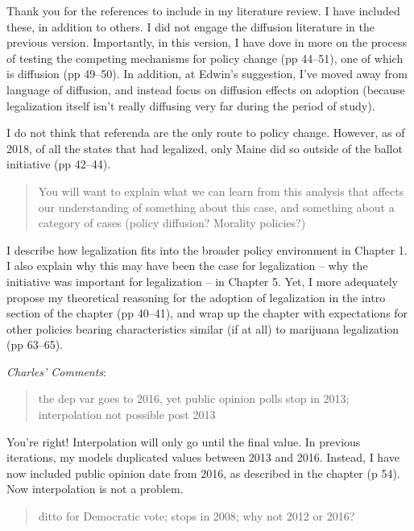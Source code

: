 \documentclass[12pt,stdletter,dateno,sigleft]{newlfm} %
\begin{document}
\begin{newlfm}
Thank you for the references to include in my literature review. I have included these, in addition to others. I did not engage the diffusion literature in the previous version. Importantly, in this version, I have dove in more on the process of testing the competing mechanisms for policy change (pp 44--51), one of which is diffusion (pp 49--50). In addition, at Edwin's suggestion, I've moved away from language of diffusion, and instead focus on diffusion effects on adoption (because legalization itself isn't really diffusing very far during the period of study). 

I do not think that referenda are the only route to policy change. However, as of 2018, of all the states that had legalized, only Maine did so outside of the ballot initiative (pp 42--44). 


\begin{quotation}{\color{red}\noindent \footnotesize
You will want to explain what we can learn from this analysis that affects our understanding of something about this case, and something about a category of cases (policy diffusion? Morality policies?)
}
\end{quotation}


I describe how legalization fits into the broader policy environment in Chapter 1. I also explain why this may have been the case for legalization -- why the initiative was important for legalization -- in Chapter 5.  Yet, I more adequately propose my theoretical reasoning for the adoption of legalization in the intro section of the chapter (pp 40--41), and wrap up the chapter with expectations for other policies bearing characteristics similar (if at all) to marijuana legalization (pp 63--65). \newline


\textit{Charles' Comments}:

\begin{quotation}{\color{red}\noindent \footnotesize
the dep var goes to 2016, yet public opinion polls stop in 2013; interpolation not possible post 2013
}
\end{quotation}

You're right! Interpolation will only go until the final value. In previous iterations, my models duplicated values between 2013 and 2016. Instead, I have now included public opinion date from 2016, as described in the chapter (p 54). Now interpolation is not a problem.

\begin{quotation}{\color{red}\noindent \footnotesize
ditto for Democratic vote; stops in 2008; why not 2012 or 2016?
}
\end{quotation}


\end{newlfm}
\end{document}
